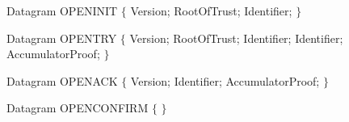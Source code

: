 \documentclass[border=2pt]{standalone}
\begin{document}
\begin{varwidth}{\linewidth}

\begin{algorithmic}
\State Datagram OPENINIT $\{$
\Indent
\State Version;
\State RootOfTrust;
\State Identifier;
\EndIndent
\State $\}$
\end{algorithmic}

\begin{algorithmic}
\State Datagram OPENTRY $\{$
\Indent
\State Version;
\State RootOfTrust;
\State Identifier;
\State Identifier;
\State AccumulatorProof;
\EndIndent
\State $\}$
\end{algorithmic}

\begin{algorithmic}
\State Datagram OPENACK $\{$
\Indent
\State Version;
\State Identifier;
\State AccumulatorProof;
\EndIndent
\State $\}$
\end{algorithmic}

\begin{algorithmic}
\State Datagram OPENCONFIRM $\{$
\Indent
\EndIndent
\State $\}$
\end{algorithmic}

\begin{algorithmic}
    \EndCase
    \EndCase
    \EndCase
    \EndCase
  \EndSwitch
\EndFunction
\end{algorithmic}

\end{varwidth}
\end{document}
